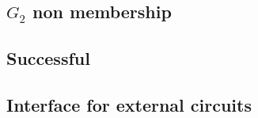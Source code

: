 \subsection{$G_2$ non membership}                    \label{ec data: circuits: G2 non membership}              
\subsection{Successful }             \label{ec data: circuits: successful pairing}             
\subsection{Interface for external circuits}                     \label{ec data: interface for exernal circuits}                      
